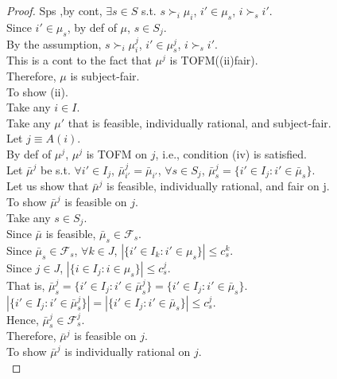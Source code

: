 \documentclass[a4j,10pt]{jsarticle}
\theoremstyle{definition}
\theoremstyle{remark}
\theoremstyle{plain}
\begin{document}
\begin{tcolorbox}[enhanced,breakable=true]
\begin{proof}
    Sps ,by cont, $\exists s \in S$ s.t.  $s \succ_i \mu_i$, $i' \in \mu_s$, $i \succ_s i'$.\\
    Since $i' \in \mu_s $, by def of $\mu$, $s \in S_j$.\\
    By the assumption, $s \succ_i \mu^j_i$, $i' \in \mu^j_s$, $i \succ_s i'$.\\
    This is a cont to the fact that $\mu^j$ is TOFM((ii)fair).\\
    Therefore, $\mu$ is subject-fair.\\
    To show (ii).\\
    Take any $i \in I$.\\
    Take any $\mu'$ that is feasible, individually rational, and subject-fair.\\
    Let $j \equiv A(i)$.\\
    By def of $\mu^j$, $\mu^j$ is TOFM on $j$, i.e., condition (iv) is satisfied.\\
    Let $\bar{\mu}^{j}$ be s.t. $\forall i' \in I_j$, $\bar{\mu}^j_{i'} = \bar{\mu}_{i'}$, $\forall s \in S_j$, $\bar{\mu}^j_s = \{ i' \in I_j : i' \in \bar{\mu}_s\}$.\\
    Let us show that $\bar{\mu}^j$ is feasible, individually rational, and fair on j.\\
    To show $\bar{\mu}^j$ is feasible on $j$.\\
    Take any $s \in S_j$.\\
    Since $\bar{\mu}$ is feasible, $\bar{\mu}_s \in \mathcal{F}_s$.\\
    Since $\bar{\mu}_s \in \mathcal{F}_s$, $\forall k \in J$, $|\{i' \in I_k : i' \in \mu_s\}| \leq c^k_s$.\\
    Since $j \in J$, $|\{i \in I_j : i \in \mu_s\}| \leq c^j_s$.\\
    That is, $\bar{\mu}^j_s = \{ i' \in I_j : i' \in \bar{\mu}^j_s\} = \{ i' \in I_j : i' \in \bar{\mu}_s\}$.\\
    $|\{ i' \in I_j : i' \in \bar{\mu}^j_s\}| = |\{ i' \in I_j : i' \in \bar{\mu}_s\}| \leq c^j_s$.\\
    Hence, $\bar{\mu}^j_s \in \mathcal{F}^j_s$.\\
    Therefore, $\bar{\mu}^j$ is feasible on $j$.\\
    To show $\bar{\mu}^j$ is individually rational on $j$.\\

\end{proof}
\end{tcolorbox}
\end{document}
